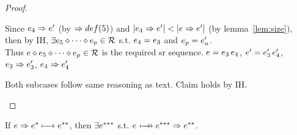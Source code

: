 \documentclass{article}
\begin{document}
\begin{proof}
\begin{byCases}
  Since $e_4 \Rightarrow e'$ (by $\Rightarrow def(5)$)
  and $|e_4 \Rightarrow e'| < |e \Rightarrow e'|$
  (by lemma~\ref{lem:size}), \\
  then by IH, $\exists e_5\diamond\cdots\diamond e_p\in\mathcal{R}$ 
       s.t. $e_4 = e_3$ and $e_p = e_n'$. \\
  Thus $e\diamond e_5\diamond\cdots\diamond e_p\in\mathcal{R}$ is the required sr sequence.
  $e = e_3\,e_4$, $e' = e_3'\,e_4'$, 
  $e_3 \Rightarrow e_3'$, $e_4 \Rightarrow e_4'$
  \renewcommand{\byCasesCaseTemplate}[1]{\textbf{Subcase {#1}.}}
  \begin{byCases}
  \end{byCases}
  Both subcases follow same reasoning as text.
  \renewcommand{\byCasesCaseTemplate}[1]{\textbf{Case {#1}.}}
  Claim holds by IH.
\end{byCases}
\end{proof}


\newcommand{\eone}{\e^{*}}
\newcommand{\etwo}{\e^{**}}
\newcommand{\ethree}{\e^{***}}

\begin{lemma}
\label{lem:srstep}
If $\e \pstep \eone \srstep \etwo$, then $\exists \ethree$ s.t. $\e \srsteps
\ethree \pstep \etwo$.
\end{lemma}
\end{document}
